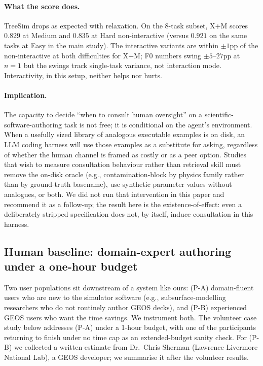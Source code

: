 \documentclass{article}
\begin{document}
\paragraph{What the score does.} TreeSim drops as expected with relaxation. On the 8-task subset, X+M scores $0.829$ at Medium and $0.835$ at Hard non-interactive (versus $0.921$ on the same tasks at Easy in the main study). The interactive variants are within $\pm 1$pp of the non-interactive at both difficulties for X+M; F0 numbers swing $\pm 5$--$27$pp at $n=1$ but the swings track single-task variance, not interaction mode. Interactivity, in this setup, neither helps nor hurts.

\paragraph{Implication.} The capacity to decide ``when to consult human oversight'' on a scientific-software-authoring task is not free; it is conditional on the agent's environment. When a usefully sized library of analogous executable examples is on disk, an LLM coding harness will use those examples as a substitute for asking, regardless of whether the human channel is framed as costly or as a peer option. Studies that wish to measure consultation behaviour rather than retrieval skill must remove the on-disk oracle (e.g., contamination-block by physics family rather than by ground-truth basename), use synthetic parameter values without analogues, or both. We did not run that intervention in this paper and recommend it as a follow-up; the result here is the existence-of-effect: even a deliberately stripped specification does not, by itself, induce consultation in this harness.

\subsection{Human baseline: domain-expert authoring under a one-hour budget}
\label{subsec:human-baseline}

Two user populations sit downstream of a system like ours: (P-A) domain-fluent users who are new to the simulator software (e.g., subsurface-modelling researchers who do not routinely author GEOS decks), and (P-B) experienced GEOS users who want the time savings. We instrument both. The volunteer case study below addresses (P-A) under a 1-hour budget, with one of the participants returning to finish under no time cap as an extended-budget sanity check. For (P-B) we collected a written estimate from Dr.~Chris Sherman (Lawrence Livermore National Lab), a GEOS developer; we summarise it after the volunteer results.
\end{document}
